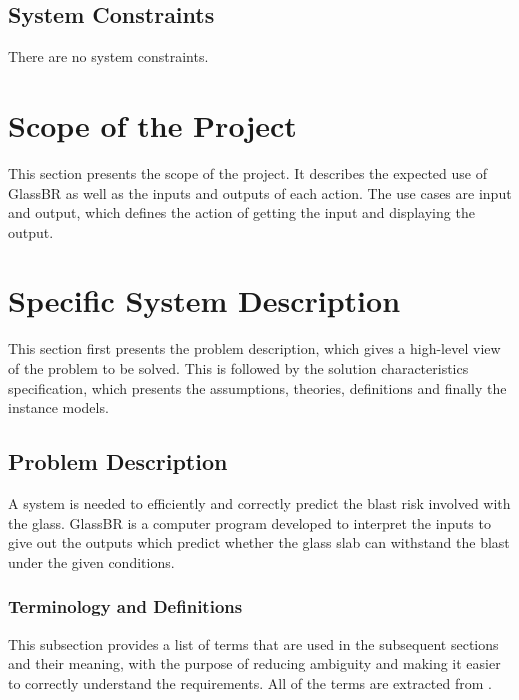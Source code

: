 \documentclass[12pt]{article}
\newcommand{\progname}{GlassBR}
\begin{document}
\subsection{System Constraints}

There are no system constraints.

\section{Scope of the Project}

This section presents the scope of the project. It describes the expected use of
\progname{} as well as the inputs and outputs of each action.  The use cases are
input and output, which defines the action of getting the input and displaying
the output.


\section{Specific System Description}

This section first presents the problem description, which gives a high-level
view of the problem to be solved.  This is followed by the solution characteristics
specification, which presents the assumptions, theories, definitions and finally
the instance models. 

\subsection{Problem Description}\label{Sec_pd}

A system is needed to efficiently and correctly predict the blast risk involved
with the glass. \progname{} is a computer program developed to interpret the
inputs to give out the outputs which predict whether the glass slab can
withstand the blast under the given conditions.


\subsubsection{Terminology and  Definitions}

This subsection provides a list of terms that are used in the subsequent
sections and their meaning, with the purpose of reducing ambiguity and making it
easier to correctly understand the requirements.  All of the terms are extracted
from \cite{ASTM2009}.
\end{document}
